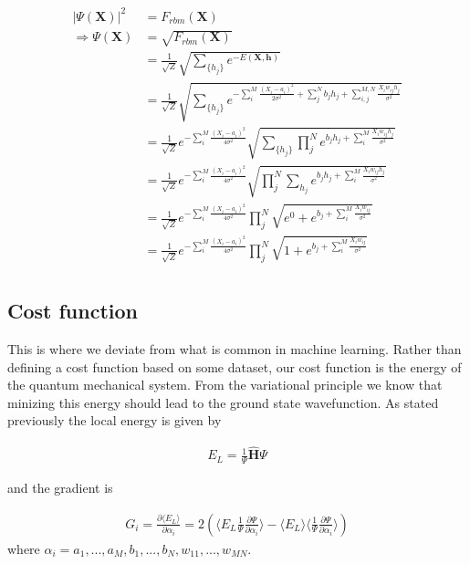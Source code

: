 \documentclass[twoside,english]{uiofysmaster}
\begin{document}
\begin{align}
	|\Psi (\mathbf{X})|^2 &= F_{rbm}(\mathbf{X}) \\
	\Rightarrow \Psi (\mathbf{X}) &= \sqrt{F_{rbm}(\mathbf{X})} \\
	&= \frac{1}{\sqrt{Z}}\sqrt{\sum_{\{h_j\}} e^{-E(\mathbf{X}, \mathbf{h})}} \\
	&= \frac{1}{\sqrt{Z}} \sqrt{\sum_{\{h_j\}} e^{-\sum_i^M \frac{(X_i - a_i)^2}{2\sigma^2} + \sum_j^N b_j h_j + \sum_{i,j}^{M,N} \frac{X_i w_{ij} h_j}{\sigma^2}} }\\
	&= \frac{1}{\sqrt{Z}} e^{-\sum_i^M \frac{(X_i - a_i)^2}{4\sigma^2}} \sqrt{\sum_{\{h_j\}} \prod_j^N e^{b_j h_j + \sum_i^M \frac{X_i w_{ij} h_j}{\sigma^2}}} \\
	&= \frac{1}{\sqrt{Z}} e^{-\sum_i^M \frac{(X_i - a_i)^2}{4\sigma^2}} \sqrt{\prod_j^N \sum_{h_j}  e^{b_j h_j + \sum_i^M \frac{X_i w_{ij} h_j}{\sigma^2}}} \\
	&= \frac{1}{\sqrt{Z}} e^{-\sum_i^M \frac{(X_i - a_i)^2}{4\sigma^2}} \prod_j^N \sqrt{e^0 + e^{b_j + \sum_i^M \frac{X_i w_{ij}}{\sigma^2}}} \\
	&= \frac{1}{\sqrt{Z}} e^{-\sum_i^M \frac{(X_i - a_i)^2}{4\sigma^2}} \prod_j^N \sqrt{1 + e^{b_j + \sum_i^M \frac{X_i w_{ij}}{\sigma^2}}} \\
\end{align}

\subsection{Cost function}
This is where we deviate from what is common in machine learning. Rather than defining a cost function based on some dataset, our cost function is the energy of the quantum mechanical system. From the variational principle we know that minizing this energy should lead to the ground state wavefunction. As stated previously the local energy is given by

\begin{align}
	E_L = \frac{1}{\Psi} \hat{\mathbf{H}} \Psi
\end{align}

and the gradient is

\begin{align}
	G_i = \frac{\partial \langle E_L \rangle}{\partial \alpha_i}
	= 2(\langle E_L \frac{1}{\Psi}\frac{\partial \Psi}{\partial \alpha_i} \rangle - \langle E_L \rangle \langle \frac{1}{\Psi}\frac{\partial \Psi}{\partial \alpha_i} \rangle )
\end{align}
where $\alpha_i = a_1,...,a_M,b_1,...,b_N,w_{11},...,w_{MN}$.
\end{document}
